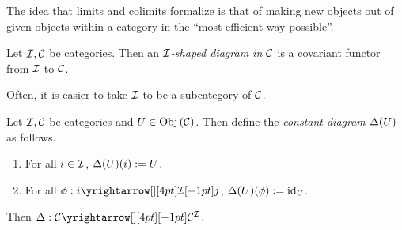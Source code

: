 \begin{rmk}
  The idea that limits and colimits formalize is 
  that of making new objects out of given objects within a category
  in the ``most efficient way possible''. 
\end{rmk}

\begin{dfn}[Diagrams]
  
  Let $\mathcal{I}, \mathcal{C}$ be categories. 
  Then an \emph{$\mathcal{I}$-shaped diagram in $\mathcal{C}$} is 
  a covariant functor from $\mathcal{I}$ to $\mathcal{C}$. 
\end{dfn}

\begin{rmk}
  Often, it is easier to take $\mathcal{I}$ to be a subcategory of $\mathcal{C}$. 
\end{rmk}

\begin{dfn}
  
  Let $\mathcal{I}, \mathcal{C}$ be categories and $U \in \mathrm{Obj}\left(\mathcal{C}\right)$. 
  Then define the \emph{constant diagram $\Delta(U)$} as follows. 
  \begin{enumerate}
    \item For all $i \in \mathcal{I}$, $\Delta(U)(i) := U$. 
    \item For all $\phi : \map{i}{j}{\II}{}$, 
    $\Delta(U)(\phi) := \mathrm{id}_{U}$.
  \end{enumerate}
  Then $\De : \map{\CC}{\CC^\II}{}{}$.
\end{dfn}

%   

